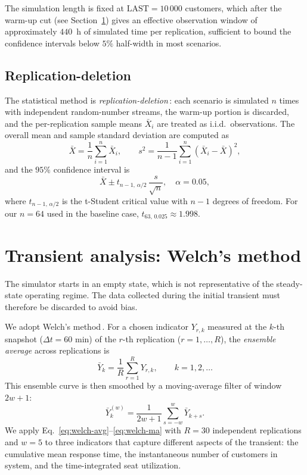 \documentclass[11pt,a4paper]{article}
\begin{document}
The simulation length is fixed at $\mathrm{LAST} = 10\,000$ customers,
which after the warm-up cut (see Section~\ref{sec:warmup}) gives an
effective observation window of approximately $440$~h of simulated
time per replication, sufficient to bound the confidence intervals
below $5\%$ half-width in most scenarios.

\subsection{Replication-deletion}
\label{sec:repdel}
The statistical method is \emph{replication-deletion}\,\cite{leemis_park}:
each scenario is simulated $n$ times with independent random-number
streams, the warm-up portion is discarded, and the per-replication
sample means $\bar X_i$ are treated as i.i.d.\ observations. The
overall mean and sample standard deviation are computed as
\begin{equation}
\bar X = \frac{1}{n}\sum_{i=1}^n \bar X_i, \qquad
s^2 = \frac{1}{n-1}\sum_{i=1}^n (\bar X_i - \bar X)^2,
\label{eq:meanstd}
\end{equation}
and the $95\%$ confidence interval is
\begin{equation}
\bar X \pm t_{n-1,\,\alpha/2}\,\frac{s}{\sqrt{n}}, \quad \alpha = 0.05,
\label{eq:ci}
\end{equation}
where $t_{n-1,\,\alpha/2}$ is the t-Student critical value with $n-1$
degrees of freedom. For our $n=64$ used in the baseline case,
$t_{63,\,0.025} \approx 1.998$.

\section{Transient analysis: Welch's method}
\label{sec:warmup}

The simulator starts in an empty state, which is not representative
of the steady-state operating regime. The data collected during the
initial transient must therefore be discarded to avoid bias.

We adopt Welch's method\,\cite{leemis_park}. For a chosen indicator
$Y_{r,k}$ measured at the $k$-th snapshot ($\Delta t = 60$ min) of
the $r$-th replication ($r = 1,\ldots,R$), the \emph{ensemble average}
across replications is
\begin{equation}
\bar Y_k = \frac{1}{R}\sum_{r=1}^{R} Y_{r,k}, \qquad k = 1, 2, \ldots
\label{eq:welch-avg}
\end{equation}
This ensemble curve is then smoothed by a moving-average filter of
window $2w+1$:
\begin{equation}
\bar Y_k^{(w)} = \frac{1}{2w+1}\sum_{s=-w}^{w} \bar Y_{k+s}.
\label{eq:welch-ma}
\end{equation}
We apply Eq.~\eqref{eq:welch-avg}--\eqref{eq:welch-ma} with $R = 30$
independent replications and $w = 5$ to three indicators that capture
different aspects of the transient: the cumulative mean response time,
the instantaneous number of customers in system, and the time-integrated
seat utilization.
\end{document}
